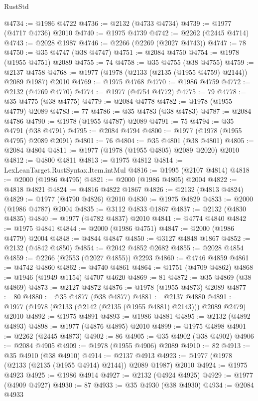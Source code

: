 \begin{lexlean}{RustStd}
\begin{coremodule}
{\begin{coremodule}
{{{{{{{{{{{{{{{{{{{{{{{{{{{{{{{@4734 := @1986 @4722
@4736 := @2132 (@4733 @4734)
@4739 := @1977 (@4717 @4736) @2010
@4740 := @1975 @4739
@4742 := @2262 (@2445 @4714)
@4743 := @2028 @1987
@4746 := @2266 (@2269 (@2027 @4743))
@4747 := 78
@4750 := @35 @4747 (@38 @4747)
@4751 := @2084 @4750
@4754 := @1978 (@1955 @4751) @2089
@4755 := 74
@4758 := @35 @4755 (@38 @4755)
@4759 := @2137 @4758
@4768 := @1977 (@1978 (@2133 (@2135 (@1955 @4759) @2144)) @2089 @1987) @2010
@4769 := @1975 @4768
@4770 := @1986 @4759
@4772 := @2132 (@4769 @4770)
@4774 := @1977 (@4754 @4772)
@4775 := 79
@4778 := @35 @4775 (@38 @4775)
@4779 := @2084 @4778
@4782 := @1978 (@1955 @4779) @2089
@4783 := 77
@4786 := @35 @4783 (@38 @4783)
@4787 := @2084 @4786
@4790 := @1978 (@1955 @4787) @2089
@4791 := 75
@4794 := @35 @4791 (@38 @4791)
@4795 := @2084 @4794
@4800 := @1977 (@1978 (@1955 @4795) @2089 @2091)
@4801 := 76
@4804 := @35 @4801 (@38 @4801)
@4805 := @2084 @4804
@4811 := @1977 (@1978 (@1955 @4805) @2089 @2020) @2010
@4812 := @4800 @4811
@4813 := @1975 @4812
@4814 := LexLeanTarget.RustSyntax.Item.intMul
@4816 := @1995 (@2107 @4814)
@4818 := @2000 (@1986 @4795)
@4821 := @2000 (@1986 @4805) @2004
@4822 := @4818 @4821
@4824 := @4816 @4822 @1867
@4826 := @2132 (@4813 @4824)
@4829 := @1977 (@4790 @4826) @2010
@4830 := @1975 @4829
@4833 := @2000 (@1986 @4787) @2004
@4835 := @3112 @4833 @1867
@4837 := @2132 (@4830 @4835)
@4840 := @1977 (@4782 @4837) @2010
@4841 := @4774 @4840
@4842 := @1975 @4841
@4844 := @2000 (@1986 @4751)
@4847 := @2000 (@1986 @4779) @2004
@4848 := @4844 @4847
@4850 := @3127 @4848 @1867
@4852 := @2132 (@4842 @4850)
@4854 := @2042 @4852 @2682
@4855 := @2028 @4854
@4859 := @2266 (@2553 (@2027 @4855)) @2293
@4860 := @4746 @4859
@4861 := @4742 @4860
@4862 := @4740 @4861
@4864 := @1751 (@4709 @4862)
@4868 := @1946 (@1949 @1154) @4707 @4620
@4869 := 81
@4872 := @35 @4869 (@38 @4869)
@4873 := @2127 @4872
@4876 := @1978 (@1955 @4873) @2089
@4877 := 80
@4880 := @35 @4877 (@38 @4877)
@4881 := @2137 @4880
@4891 := @1977 (@1978 (@2133 (@2142 (@2135 (@1955 @4881) @2143))) @2089 @2479) @2010
@4892 := @1975 @4891
@4893 := @1986 @4881
@4895 := @2132 (@4892 @4893)
@4898 := @1977 (@4876 @4895) @2010
@4899 := @1975 @4898
@4901 := @2262 (@2445 @4873)
@4902 := 86
@4905 := @35 @4902 (@38 @4902)
@4906 := @2084 @4905
@4909 := @1978 (@1955 @4906) @2089
@4910 := 82
@4913 := @35 @4910 (@38 @4910)
@4914 := @2137 @4913
@4923 := @1977 (@1978 (@2133 (@2135 (@1955 @4914) @2144)) @2089 @1987) @2010
@4924 := @1975 @4923
@4925 := @1986 @4914
@4927 := @2132 (@4924 @4925)
@4929 := @1977 (@4909 @4927)
@4930 := 87
@4933 := @35 @4930 (@38 @4930)
@4934 := @2084 @4933
}}}}}}}}}}}}}}}}}}}}}}}}}}}}}}}
\end{coremodule}}
\end{coremodule}
\end{lexlean}
